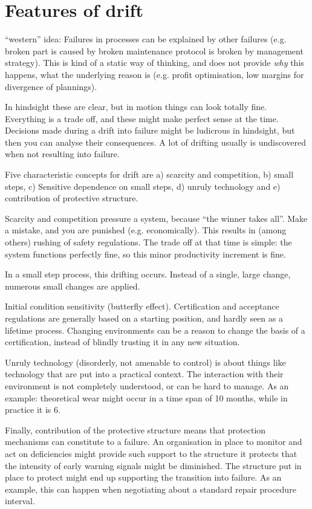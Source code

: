 \section{Features of drift}
``western'' idea: Failures in processes can be explained by other failures (e.g. broken part is caused by broken maintenance protocol is broken by management strategy).
This is kind of a static way of thinking, and does not provide \emph{why} this happens, what the underlying reason is (e.g. profit optimisation, low margins for divergence of plannings).

In hindsight these are clear, but in motion things can look totally fine. 
Everything is a trade off, and these might make perfect sense at the time.
Decisions made during a drift into failure might be ludicrous in hindsight, but then you can analyse their consequences. 
A lot of drifting usually is undiscovered when not resulting into failure.

Five characteristic concepts for drift are a) scarcity and competition, b) small steps, c) Sensitive dependence on small steps, d) unruly technology and e) contribution of protective structure.

Scarcity and competition pressure a system, because ``the winner takes all''. Make a mistake, and you are punished (e.g. economically). 
This results in (among others) rushing of safety regulations. 
The trade off at that time is simple: the system functions perfectly fine, so this minor productivity increment is fine.

In a small step process, this drifting occurs. 
Instead of a single, large change, numerous small changes are applied.

Initial condition sensitivity (butterfly effect).
Certification and acceptance regulations are generally based on a starting position, and hardly seen as a lifetime process. 
Changing environments can be a reason to change the basis of a certification, instead of blindly trusting it in any new situation.

Unruly technology (disorderly, not amenable to control) is about things like technology that are put into a practical context. 
The interaction with their environment is not completely understood, or can be hard to manage. 
As an example: theoretical wear might occur in a time span of 10 months, while in practice it is 6.

Finally, contribution of the protective structure means that protection mechanisms can constitute to a failure. 
An organisation in place to monitor and act on deficiencies might provide such support to the structure it protects that the intensity of early warning signals might be diminished. 
The structure put in place to protect might end up supporting the transition into failure.
As an example, this can happen when negotiating about a standard repair procedure interval.

